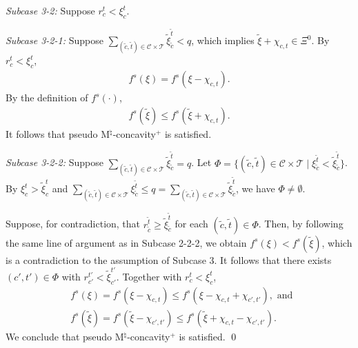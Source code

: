 \documentclass[12pt]{amsart}
\newcommand{\corigin}{c'}
\theoremstyle{remark}
\begin{document}
\smallskip
\noindent
\emph{Subcase 3-2:}
Suppose $r_c^t<\xi_c^t$.

\smallskip
\noindent
\emph{Subcase 3-2-1:}
Suppose $\sum_{(\tilde c,\tilde t)\in \mathcal{C}\times \mathcal{T}}\tilde \xi_{\tilde c}^{\tilde t}<q$, which implies $\tilde \xi+\chi_{c,t}\in \Xi^0$. By $r_c^t<\xi_c^t$,
\begin{align*}
f^s(\xi)=f^s(\xi-\chi_{c,t}).
\end{align*}
By the definition of $f^s(\cdot)$,
\begin{align*}
f^s(\tilde \xi)\leq f^s(\tilde \xi+\chi_{c,t}).
\end{align*}
It follows that pseudo M$^\natural$-concavity$^+$ is satisfied.

\smallskip
\noindent
\emph{Subcase 3-2-2:}
Suppose $\sum_{(\tilde c,\tilde t)\in \mathcal{C}\times \mathcal{T}}\tilde \xi_{\tilde c}^{\tilde t}=q$. Let $\Phi=\{(\tilde c, \tilde t)\in \mathcal{C}\times \mathcal{T} \mid \xi_{\tilde c}^{\tilde t}<\tilde \xi_{\tilde c}^{\tilde t}\}$. By $\xi_c^t>\tilde \xi_c^t$ and $\sum_{(\tilde c,\tilde t)\in \mathcal{C}\times \mathcal{T}}\xi_{\tilde c}^{\tilde t}\leq q=\sum_{(\tilde c,\tilde t)\in \mathcal{C}\times \mathcal{T}}\tilde \xi_{\tilde c}^{\tilde t}$, we have $\Phi \neq \emptyset$.

Suppose, for contradiction, that $r_{\tilde c}^{\tilde t}\geq \tilde \xi_{\tilde c}^{\tilde t}$ for each
$(\tilde c, \tilde t)\in \Phi$. Then, by following the same line of argument as in Subcase 2-2-2, we obtain $f^s(\xi)<f^s(\tilde \xi)$, which is a contradiction to the assumption of Subcase 3. It follows that there exists $(\corigin,t')\in \Phi$ with $r_{\corigin}^{t'}<\tilde \xi_{\corigin}^{t'}$. Together with $r_c^t<\xi_c^t$,
\begin{align*}
&f^s(\xi)=f^s(\xi-\chi_{c,t})\leq f^s(\xi-\chi_{c,t}+\chi_{\corigin,t'}), \text{ and } \\
&f^s(\tilde \xi)=f^s(\tilde \xi-\chi_{\corigin,t'})\leq f^s(\tilde \xi+\chi_{c,t}-\chi_{\corigin,t'}).
\end{align*}
We conclude that pseudo M$^\natural$-concavity$^+$ is satisfied.
\qed
\end{document}

